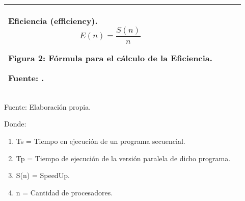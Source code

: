 \begin{table}[h!]
\begin{tabular}{|p{3cm}|p{3cm}|p{3cm}|p{4cm}|}
                Eficiencia (efficiency). 
                \begin{equation*}\label{}
                    E(n) = \frac{S(n)}{n}                   
                \end{equation*}                
                \begin{center}
                    { Figura 2: Fórmula para el cálculo de la Eficiencia.}\par
                    { Fuente: {\cite{rafael2009}}. }                       
                \end{center}
                \\ \hline

                \end{tabular}
                \begin{center}
                    \vskip -0.2cm
                    {\small{Fuente: Elaboración propia.}}
                \end{center}
            \end{table}
            Donde:
            \vskip 0.3cm
            \begin{enumerate}
                \item[]{Ts = Tiempo en ejecución de un programa secuencial.}
                \item[]{Tp = Tiempo de ejecución de la versión paralela de dicho programa.}
                \item[]{S(n) = SpeedUp.}
                \item[]{n = Cantidad de procesadores.}
            \end{enumerate}\par    
